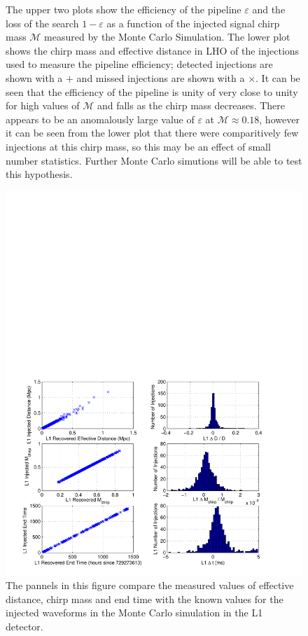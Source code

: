 \begin{figure}[p]
{\label{f:mchirp_eff}%
The upper two plots show the efficiency of the pipeline $\varepsilon$ and the
loss of the search $1-\varepsilon$ as a function of the injected signal chirp
mass $\mathcal{M}$ measured by the Monte Carlo Simulation. The lower plot
shows the chirp mass and effective distance in LHO of the injections used to
measure the pipeline efficiency; detected injections are shown with a $+$ and
missed injections are shown with a $\times$. It can be seen that the
efficiency of the pipeline is unity of very close to unity for high values of
$\mathcal{M}$ and falls as the chirp mass decreases. There appears to be an
anomalously large value of $\varepsilon$ at $\mathcal{M}\approx 0.18$, however
it can be seen from the lower plot that there were comparitively few
injections at this chirp mass, so this may be an effect of small number
statistics. Further Monte Carlo simutions will be able to test this
hypothesis.
}
\end{figure}

\begin{figure}[p]
\begin{center}
\includegraphics[width=\textwidth]{figures/result/l1_param_error}
\end{center}
\caption[Measurement accuracy of L1 Injection Parameters]{%
\label{f:l1_param_error}%
The pannels in this figure compare the measured values of effective distance,
chirp mass and end time with the known values for the injected waveforms in
the Monte Carlo simulation in the L1 detector.
}
\end{figure}

